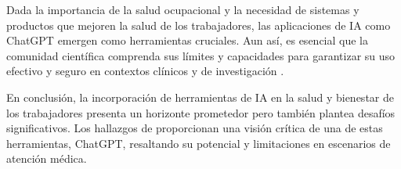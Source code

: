Dada la importancia de la salud ocupacional y la necesidad de sistemas y productos que mejoren la salud de los trabajadores, las aplicaciones de IA como ChatGPT emergen como herramientas cruciales. Aun así, es esencial que la comunidad científica comprenda sus límites y capacidades para garantizar su uso efectivo y seguro en contextos clínicos y de investigación \citep{Cascella2023EvaluatingScenarios}.

En conclusión, la incorporación de herramientas de IA en la salud y bienestar de los trabajadores presenta un horizonte prometedor pero también plantea desafíos significativos. Los hallazgos de \citet{Cascella2023EvaluatingScenarios} proporcionan una visión crítica de una de estas herramientas, ChatGPT, resaltando su potencial y limitaciones en escenarios de atención médica.










